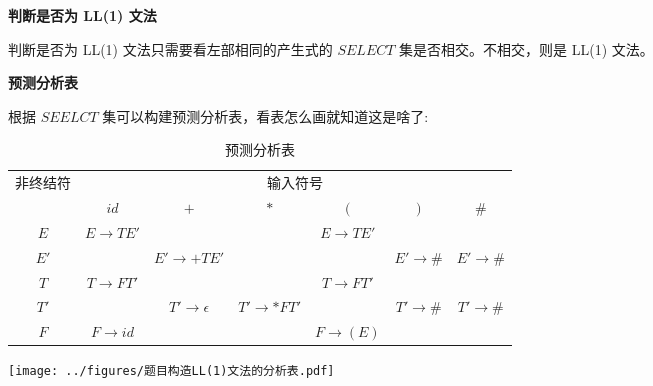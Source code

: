 \noindent\textbf{判断是否为 LL(1) 文法}

判断是否为 LL(1) 文法只需要看左部相同的产生式的 $SELECT$ 集是否相交。不相交，则是 LL(1) 文法。

\noindent\textbf{预测分析表}

根据 $SEELCT$ 集可以构建预测分析表，看表怎么画就知道这是啥了:

\begin{table}[H]
    \centering
    \caption{预测分析表}
    \label{table:预测分析表}
    \setlength{\tabcolsep}{3mm}
    \begin{tabular}{c|c|c|c|c|c|c}
        \toprule
        \multirow{2}{*}{非终结符} & \multicolumn{6}{c}{输入符号}                                                                                                                       \\ \cline{2-7}
                                  & $id$                         & $+$                       & $*$                   & $($                 & $)$                 & \#                  \\
        \midrule
        $E$                       & $E \rightarrow TE'$          &                           &                       & $E\rightarrow TE'$  &                     &                     \\
        $E'$                      &                              & $E' \rightarrow +TE'$     &                       &                     & $E' \rightarrow \#$ & $E' \rightarrow \#$ \\
        $T$                       & $T\rightarrow FT'$           &                           &                       & $T\rightarrow FT'$  &                     &                     \\
        $T'$                      &                              & $T' \rightarrow \epsilon$ & $T' \rightarrow *FT'$ &                     & $T' \rightarrow \#$ & $T' \rightarrow \#$ \\
        $F$                       & $F \rightarrow id$           &                           &                       & $F \rightarrow (E)$ &                     &                     \\
        \bottomrule
    \end{tabular}
\end{table}

\texttt{[image: ../figures/题目构造LL(1)文法的分析表.pdf]}

\newpage